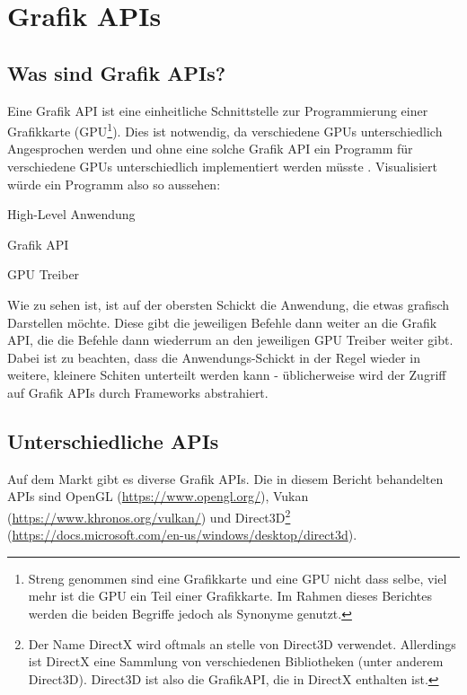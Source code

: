 
\section{Grafik APIs}

\subsection{Was sind Grafik APIs?}
Eine Grafik API ist eine einheitliche Schnittstelle zur Programmierung einer Grafikkarte (GPU\footnote{Streng genommen sind eine Grafikkarte und eine GPU nicht dass selbe, viel mehr ist die GPU ein Teil einer Grafikkarte. Im Rahmen dieses Berichtes werden die beiden Begriffe jedoch als Synonyme genutzt.}). Dies ist notwendig, da verschiedene GPUs unterschiedlich Angesprochen werden und ohne eine solche Grafik API ein Programm für verschiedene GPUs unterschiedlich implementiert werden müsste \cite{samsung_what_is_a_graphics_api}. Visualisiert würde ein Programm also so aussehen:

\begin{tcolorbox}
    \begin{tcolorbox}
        \begin{center}
            High-Level Anwendung
        \end{center}
    \end{tcolorbox}
    \begin{tcolorbox}
        \begin{center}
            Grafik API
        \end{center}
    \end{tcolorbox}
    \begin{tcolorbox}
        \begin{center}
            GPU Treiber
        \end{center}
    \end{tcolorbox}
\end{tcolorbox}

Wie zu sehen ist, ist auf der obersten Schickt die Anwendung, die etwas grafisch Darstellen möchte. Diese gibt die jeweiligen Befehle dann weiter an die Grafik API, die die Befehle dann wiederrum an den jeweiligen GPU Treiber weiter gibt. Dabei ist zu beachten, dass die Anwendungs-Schickt in der Regel wieder in weitere, kleinere Schiten unterteilt werden kann - üblicherweise wird der Zugriff auf Grafik APIs durch Frameworks abstrahiert.

\subsection{Unterschiedliche APIs}
Auf dem Markt gibt es diverse Grafik APIs. Die in diesem Bericht behandelten APIs sind OpenGL (\url{https://www.opengl.org/}), Vukan (\url{https://www.khronos.org/vulkan/}) und Direct3D\footnote{Der Name DirectX wird oftmals an stelle von Direct3D verwendet. Allerdings ist DirectX eine Sammlung von verschiedenen Bibliotheken (unter anderem Direct3D). Direct3D ist also die GrafikAPI, die in DirectX enthalten ist.} (\url{https://docs.microsoft.com/en-us/windows/desktop/direct3d}).

